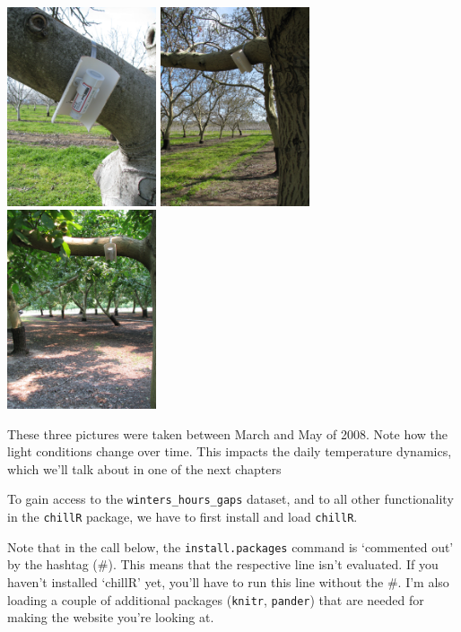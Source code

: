 \documentclass[
]{book}
\begin{document}
\includegraphics[width=0.33\textwidth,height=\textheight]{pictures/Walnuts_March.JPG} \includegraphics[width=0.33\textwidth,height=\textheight]{pictures/Walnuts_April.JPG} \includegraphics[width=0.33\textwidth,height=\textheight]{pictures/Walnuts_May.JPG}

These three pictures were taken between March and May of 2008. Note how the light conditions change over time. This impacts the daily temperature dynamics, which we'll talk about in one of the next chapters

To gain access to the \texttt{winters\_hours\_gaps} dataset, and to all other functionality in the \texttt{chillR} package, we have to first install and load \texttt{chillR}.

Note that in the call below, the \texttt{install.packages} command is `commented out' by the hashtag (\#). This means that the respective line isn't evaluated. If you haven't installed `chillR' yet, you'll have to run this line without the \#. I'm also loading a couple of additional packages (\texttt{knitr}, \texttt{pander}) that are needed for making the website you're looking at.
\end{document}
